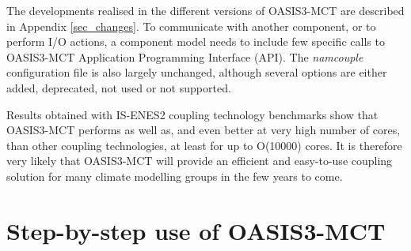 The developments realised in the different versions of OASIS3-MCT are described in Appendix \ref{sec_changes}.
To communicate with another component, or to perform I/O actions, a
component model needs to include few specific calls to OASIS3-MCT Application Programming Interface (API).  The {\it namcouple} configuration file is also largely unchanged, although several options are either added, deprecated, not used
or not supported. 

Results obtained with IS-ENES2 coupling technology benchmarks show that OASIS3-MCT performs as well as, and even better at very high number of cores, than other coupling technologies, at least for up to O(10000) cores. It is therefore very likely that OASIS3-MCT will provide an efficient and
easy-to-use coupling solution for many climate modelling groups in the few years to come. 


\section{Step-by-step use of OASIS3-MCT}

